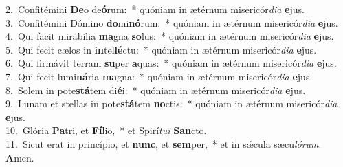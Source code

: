 {2.~}Confitémini \textbf{De}o de\textbf{ó}rum:~* quóniam in ætérnum misericór\textit{di}\textit{a} \textbf{e}jus.\\
{3.~}Confitémini Dómino \textbf{do}mi\textbf{nó}rum:~* quóniam in ætérnum misericór\textit{di}\textit{a} \textbf{e}jus.\\
{4.~}Qui facit mirabília \textbf{ma}gna \textbf{so}lus:~* quóniam in ætérnum misericór\textit{di}\textit{a} \textbf{e}jus.\\
{5.~}Qui fecit cælos in \textbf{in}tel\textbf{lé}ctu:~* quóniam in ætérnum misericór\textit{di}\textit{a} \textbf{e}jus.\\
{6.~}Qui firmávit terram \textbf{su}per \textbf{a}quas:~* quóniam in ætérnum misericór\textit{di}\textit{a} \textbf{e}jus.\\
{7.~}Qui fecit lumi\textbf{ná}ria \textbf{ma}gna:~* quóniam in ætérnum misericór\textit{di}\textit{a} \textbf{e}jus.\\
{8.~}Solem in pote\textbf{stá}tem di\textbf{é}i:~* quóniam in ætérnum misericór\textit{di}\textit{a} \textbf{e}jus.\\
{9.~}Lunam et stellas in pote\textbf{stá}tem \textbf{no}ctis:~* quóniam in ætérnum misericór\textit{di}\textit{a} \textbf{e}jus.\\
{10.~}Glória \textbf{Pa}tri, et \textbf{Fí}lio,~* et Spirí\textit{tu}\textit{i} \textbf{San}cto.\\
{11.~}Sicut erat in princípio, et \textbf{nunc}, et \textbf{sem}per,~* et in sǽcula sæcu\textit{ló}\textit{rum}. \textbf{A}men.\\
